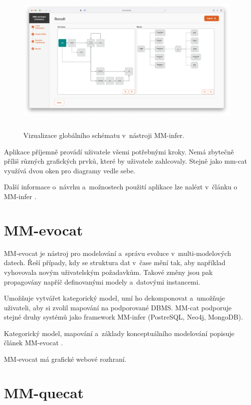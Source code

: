 \begin{figure}[htb]
  \centering
  \includegraphics[height=75mm]{../img/mm-infer-result}
  \caption{Vizualizace globálního schématu v~nástroji MM-infer.}
  \label{obr01:mm-infer-result}
\end{figure}

Aplikace příjemně provádí uživatele všemi potřebnými kroky. Nemá zbytečně příliš různých grafických prvků, které by uživatele zahlcovaly. Stejně jako mm-cat využívá dvou oken pro diagramy vedle sebe.

Další informace o~návrhu a~možnostech použití aplikace lze nalézt v~článku o MM-infer \cite{MM_infer}.

\section{MM-evocat}

MM-evocat je nástroj pro modelování a~správu evoluce v~multi-modelových datech. Řeší případy, kdy se struktura dat v~čase mění tak, aby například vyhovovala novým uživatelským požadavkům. Takové změny jsou pak propagovány napříč definovanými modely a~datovými instancemi.

Umožňuje vytvářet kategorický model, umí ho dekomponovat a~umožňuje uživateli, aby si zvolil mapování na podporované DBMS. MM-cat podporuje stejné druhy systémů jako framework MM-infer (PostreSQL, Neo4j, MongoDB).

Kategorický model, mapování a~základy konceptuálního modelování popisuje článek MM-evocat \cite{MM_evocat}.

MM-evocat má grafické webové rozhraní.


\section{MM-quecat}

